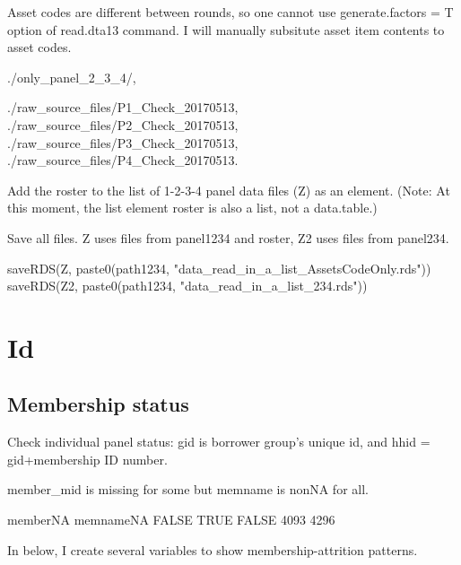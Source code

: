 	Asset codes are different between rounds, so one cannot use \textsf{generate.factors = T} option of \textsf{read.dta13} command. I will manually subsitute asset item contents to asset codes. \gobblepars



\textsf{\footnotesize ./only\_panel\_2\_3\_4/}, \gobblepars


\textsf{\footnotesize ./raw\_source\_files/P1\_Check\_20170513, ./raw\_source\_files/P2\_Check\_20170513, ./raw\_source\_files/P3\_Check\_20170513, ./raw\_source\_files/P4\_Check\_20170513}.

Add the roster to the list of 1-2-3-4 panel data files (\textsf{Z}) as an element. (Note: At this moment, the list element \textsf{roster} is also a list, not a data.table.) \gobblepars

Save all files. \textsf{Z} uses files from \textsf{panel1234} and roster, \textsf{Z2} uses files from \textsf{panel234}.
\begin{Schunk}
\begin{Sinput}
saveRDS(Z, paste0(path1234, "data_read_in_a_list_AssetsCodeOnly.rds"))
saveRDS(Z2, paste0(path1234, "data_read_in_a_list_234.rds"))
\end{Sinput}
\end{Schunk}



\section{Id}


\subsection{Membership status}

Check individual panel status: \textsf{gid} is borrower group's unique id, and \textsf{hhid} = \textsf{gid+membership ID number}. \gobblepars


\textsf{member\_mid} is missing for some but \textsf{memname} is nonNA for all.
\begin{Schunk}
\begin{Soutput}
         memberNA
memnameNA FALSE TRUE
    FALSE  4093 4296
\end{Soutput}
\end{Schunk}

In below, I create several variables to show membership-attrition patterns.

